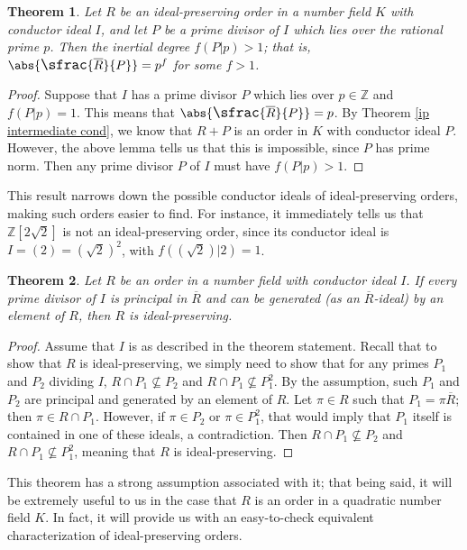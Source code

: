 \documentclass[12pt]{amsart}
\newtheorem{theorem}{Theorem}[section]
\theoremstyle{definition}
\newcommand{\bZ}{\mathbb Z}
\newcommand{\Rbar}{\overline{R}}
\newcommand{\quot}[2]{\large\sfrac{#1}{#2}\normalsize}
\begin{document}
	\begin{theorem}
		Let $R$ be an ideal-preserving order in a number field $K$ with conductor ideal $I$, and let $P$ be a prime divisor of $I$ which lies over the rational prime $p$. Then the inertial degree $f(P|p)>1$; that is, $\abs{\quot{\Rbar}{P}}=p^f$ for some $f>1$.
	\end{theorem}
	
	\begin{proof}
		Suppose that $I$ has a prime divisor $P$ which lies over $p\in \bZ$ and $f(P|p)=1$. This means that $\abs{\quot{\Rbar}{P}}=p$. By Theorem \ref{ip intermediate cond}, we know that $R+P$ is an order in $K$ with conductor ideal $P$. However, the above lemma tells us that this is impossible, since $P$ has prime norm. Then any prime divisor $P$ of $I$ must have $f(P|p)>1$. 
	\end{proof}
	
	This result narrows down the possible conductor ideals of ideal-preserving orders, making such orders easier to find. For instance, it immediately tells us that $\bZ[2\sqrt{2}]$ is not an ideal-preserving order, since its conductor ideal is $I=(2)=(\sqrt{2})^2$, with $f((\sqrt{2})|2)=1$.
	
	\begin{theorem}
		Let $R$ be an order in a number field with conductor ideal $I$. If every prime divisor of $I$ is principal in $\Rbar$ and can be generated (as an $\Rbar$-ideal) by an element of $R$, then $R$ is ideal-preserving.
	\end{theorem}
	
	\begin{proof}
		Assume that $I$ is as described in the theorem statement. Recall that to show that $R$ is ideal-preserving, we simply need to show that for any primes $P_1$ and $P_2$ dividing $I$, $R\cap P_1\nsubseteq P_2$ and $R\cap P_1\nsubseteq P_1^2$. By the assumption, such $P_1$ and $P_2$ are principal and generated by an element of $R$. Let $\pi\in R$ such that $P_1=\pi\Rbar$; then $\pi\in R\cap P_1$. However, if $\pi\in P_2$ or $\pi\in P_1^2$, that would imply that $P_1$ itself is contained in one of these ideals, a contradiction. Then $R\cap P_1\nsubseteq P_2$ and $R\cap P_1\nsubseteq P_1^2$, meaning that $R$ is ideal-preserving.
	\end{proof}
	
	This theorem has a strong assumption associated with it; that being said, it will be extremely useful to us in the case that $R$ is an order in a quadratic number field $K$. In fact, it will provide us with an easy-to-check equivalent characterization of ideal-preserving orders.
	
\end{document}
